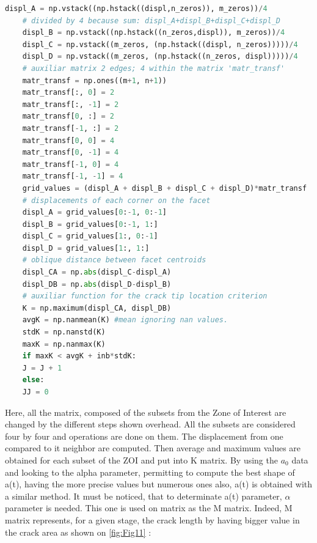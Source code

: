 \begin{lstlisting}[language=Python]
	displ_A = np.vstack((np.hstack((displ,n_zeros)), m_zeros))/4
	# divided by 4 because sum: displ_A+displ_B+displ_C+displ_D
	displ_B = np.vstack((np.hstack((n_zeros,displ)), m_zeros))/4
	displ_C = np.vstack((m_zeros, (np.hstack((displ, n_zeros)))))/4
	displ_D = np.vstack((m_zeros, (np.hstack((n_zeros, displ)))))/4
	# auxiliar matrix 2 edges; 4 within the matrix 'matr_transf'
	matr_transf = np.ones((m+1, n+1))
	matr_transf[:, 0] = 2
	matr_transf[:, -1] = 2
	matr_transf[0, :] = 2
	matr_transf[-1, :] = 2
	matr_transf[0, 0] = 4
	matr_transf[0, -1] = 4
	matr_transf[-1, 0] = 4
	matr_transf[-1, -1] = 4
	grid_values = (displ_A + displ_B + displ_C + displ_D)*matr_transf
	# displacements of each corner on the facet
	displ_A = grid_values[0:-1, 0:-1]
	displ_B = grid_values[0:-1, 1:]
	displ_C = grid_values[1:, 0:-1]
	displ_D = grid_values[1:, 1:]
	# oblique distance between facet centroids
	displ_CA = np.abs(displ_C-displ_A)
	displ_DB = np.abs(displ_D-displ_B)
	# auxiliar function for the crack tip location criterion
	K = np.maximum(displ_CA, displ_DB)
	avgK = np.nanmean(K) #mean ignoring nan values.
	stdK = np.nanstd(K)
	maxK = np.nanmax(K)
	if maxK < avgK + inb*stdK:
	J = J + 1
	else:
	JJ = 0
\end{lstlisting}

Here, all the matrix, composed of the subsets from the Zone of Interest are changed by the different steps shown overhead. All the subsets are considered four by four and operations are done on them. The displacement from one compared to it neighbor are computed. Then average and maximum values are obtained for each subset of the ZOI and put into K matrix. By using the $a_{0}$ data and looking to the alpha parameter, permitting to compute the best shape of a(t), having the more precise values but numerous ones also, a(t) is obtained with a similar method. It must be noticed, that to determinate a(t) parameter, $\alpha$ parameter is needed. This one is used on matrix as the M matrix. Indeed, M matrix represents, for a given stage, the crack length by having bigger value in the crack area as shown on \ref{fig:Fig11} : 

